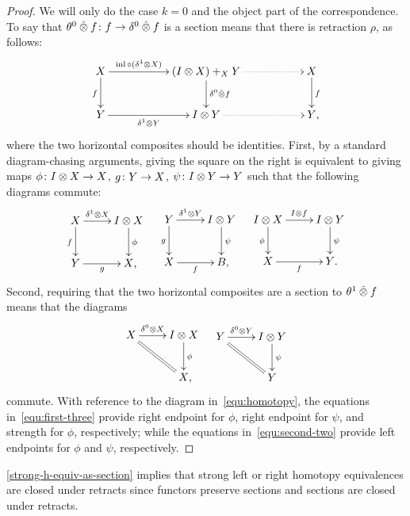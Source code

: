 \documentclass[reqno,10pt,a4paper,oneside,draft]{amsart}
\begin{document}
\begin{proof}
We will only do the case $k = 0$ and the object part of the correspondence.
To say that $\theta^0 \mathbin{\hat{\otimes}} f \colon f \to \delta^0 \mathbin{\hat{\otimes}} f$ is a section means that there is retraction $\rho$, as follows:
\[
\xymatrix@C+3em{
  X
  \ar[r]^-{\inl \cc (\rcyl \otimes X)}
  \ar[d]_f
&
  (\interval \otimes X) +_{X} Y
  \ar[d]^{\lcyl \hatotimes f}
  \ar@{.>}[r]
&
  X
  \ar[d]^f
\\
  Y
  \ar[r]_-{\rcyl \otimes Y}
&
  \interval \otimes Y
  \ar@{.>}[r]
&
  Y
\rlap{,}}
\]
where the two horizontal composites should be identities.
First, by a standard diagram-chasing arguments, giving the square on the right is equivalent to giving maps $\phi \colon I \otimes X \to X$, $g \colon Y \to X$, $\psi \colon I \otimes Y \to Y$ such that the following diagrams commute:
\begin{align} \label{equ:first-three}
\xycenter{
  X
  \ar[r]^-{\rcyl \otimes X}
  \ar[d]_f
&
  \interval \otimes X \ar[d]^{\phi}
\\
  Y \ar[r]_{g}
&
  X
\rlap{,}}
&&
\xycenter{
  Y
  \ar[r]^-{\rcyl \otimes Y}
  \ar[d]_g
&
  \interval \otimes Y \ar[d]^{\psi}
\\
  X
  \ar[r]_f
&
  B
\rlap{,}}
&&
\xycenter{
  \interval \otimes X
  \ar[d]_\phi
  \ar[r]^{I \otimes f}
&
  \interval \otimes Y
  \ar[d]^\psi
\\
  X
  \ar[r]_{f}
&
  Y
\rlap{.}}
\end{align}
Second, requiring that the two horizontal composites are a section to $\theta^1 \mathbin{\hat{\otimes}} f$ means that the diagrams
\begin{align} \label{equ:second-two}
\xycenter{
  X
  \ar[r]^-{\lcyl \otimes X}
  \ar@{=}[dr]
&
  \interval \otimes X \ar[d]^\phi
\\&
  X
\rlap{,}}
&&
\xycenter{
  Y
  \ar[r]^-{\lcyl \otimes Y}
  \ar@{=}[dr]
&
  \interval \otimes Y \ar[d]^{\psi}
\\&
  Y
}
\end{align}
commute.
With reference to the diagram in~\eqref{equ:homotopy}, the equations in~\eqref{equ:first-three} provide right endpoint for $\phi$, right endpoint for $\psi$, and strength for $\phi$, respectively; while the equations in~\eqref{equ:second-two} provide left endpoints for $\phi$ and $\psi$, respectively.
\end{proof}

\begin{remark}
\cref{strong-h-equiv-as-section} implies that strong left or right homotopy equivalences are closed under retracts since functors preserve sections and sections are closed under retracts.
\end{remark}
\end{document}
